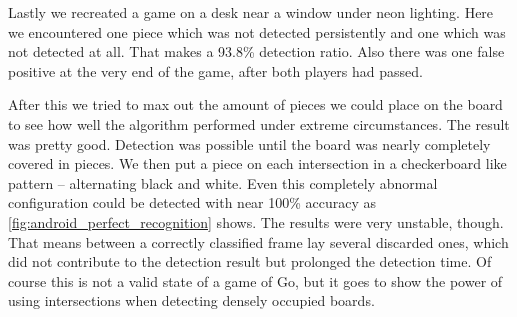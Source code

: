 	Lastly we recreated a game on a desk near a window under neon lighting. Here we encountered one piece which was not detected persistently and one which was not detected at all. That makes a 93.8\% detection ratio. Also there was one false positive at the very end of the game, after both players had passed.

	After this we tried to max out the amount of pieces we could place on the board to see how well the algorithm performed under extreme circumstances. The result was pretty good. Detection was possible until the board was nearly completely covered in pieces. We then put a piece on each intersection in a checkerboard like pattern -- alternating black and white. Even this completely abnormal configuration could be detected with near 100\% accuracy as \autoref{fig:android_perfect_recognition} shows. The results were very unstable, though. That means between a correctly classified frame lay several discarded ones, which did not contribute to the detection result but prolonged the detection time. Of course this is not a valid state of a game of Go, but it goes to show the power of using intersections when detecting densely occupied boards.
